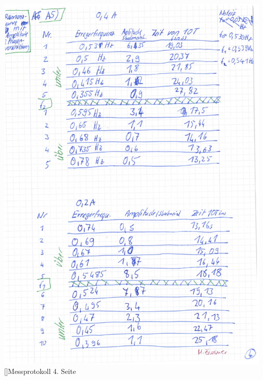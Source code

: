 \documentclass[12pt,a4paper,]{scrreprt}
\begin{document}
\begin{center}
    	\includegraphics[scale=0.33]{4.jpg}
    	[]{Messprotokoll 4. Seite}
    	\pagebreak
    \end{center}
\end{document}
